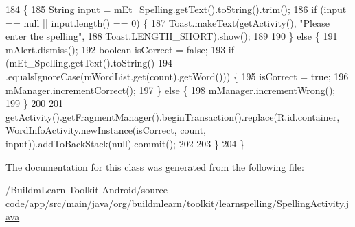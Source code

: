 \begin{DoxyCode}
184                          \{
185         String input = mEt\_Spelling.getText().toString().trim();
186         \textcolor{keywordflow}{if} (input == null || input.length() == 0) \{
187             Toast.makeText(getActivity(), \textcolor{stringliteral}{"Please enter the spelling"},
188                     Toast.LENGTH\_SHORT).show();
189 
190         \} \textcolor{keywordflow}{else} \{
191             mAlert.dismiss();
192             \textcolor{keywordtype}{boolean} isCorrect = \textcolor{keyword}{false};
193             \textcolor{keywordflow}{if} (mEt\_Spelling.getText().toString()
194                     .equalsIgnoreCase(mWordList.get(count).getWord())) \{
195                 isCorrect = \textcolor{keyword}{true};
196                 mManager.incrementCorrect();
197             \} \textcolor{keywordflow}{else} \{
198                 mManager.incrementWrong();
199             \}
200 
201             getActivity().getFragmentManager().beginTransaction().replace(R.id.container, 
      WordInfoActivity.newInstance(isCorrect, count, input)).addToBackStack(null).commit();
202 
203         \}
204     \}
\end{DoxyCode}


The documentation for this class was generated from the following file\-:\begin{DoxyCompactItemize}
\item 
/\-Buildm\-Learn-\/\-Toolkit-\/\-Android/source-\/code/app/src/main/java/org/buildmlearn/toolkit/learnspelling/\hyperlink{SpellingActivity_8java}{Spelling\-Activity.\-java}\end{DoxyCompactItemize}
